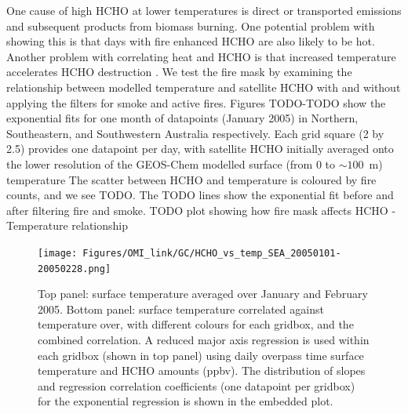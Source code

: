       
      
      
      One cause of high HCHO at lower temperatures is direct or transported emissions and subsequent products from biomass burning.
      One potential problem with showing this is that days with fire enhanced HCHO are also likely to be hot.
      Another problem with correlating heat and HCHO is that increased temperature accelerates HCHO destruction \parencite{Zheng2015}.
      We test the fire mask by examining the relationship between modelled temperature and satellite HCHO with and without applying the filters for smoke and active fires.
      Figures TODO-TODO show the exponential fits for one month of datapoints (January 2005) in Northern, Southeastern, and Southwestern Australia respectively.
      Each grid square (2 by 2.5\degr) provides one datapoint per day, with satellite HCHO initially averaged onto the lower resolution of the GEOS-Chem modelled surface (from 0 to $\sim 100$~m) temperature
      The scatter between HCHO and temperature is coloured by fire counts, and we see TODO.
      The TODO lines show the exponential fit before and after filtering fire and smoke.
      TODO plot showing how fire mask affects HCHO - Temperature relationship
      
      
      \begin{figure}
        \texttt{[image: Figures/OMI\_link/GC/HCHO\_vs\_temp\_SEA\_20050101-20050228.png]}
        \caption{%
          Top panel: surface temperature averaged over January and February 2005.
          Bottom panel: surface temperature correlated against temperature over, with different colours for each gridbox, and the combined correlation. 
          A reduced major axis regression is used within each gridbox (shown in top panel) using daily overpass time surface temperature and HCHO amounts (ppbv).
          The distribution of slopes and regression correlation coefficients (one datapoint per gridbox) for the exponential regression is shown in the embedded plot.
          }
        \label{Model:analysis:HCHO:fig_hcho_vs_temp_SEA_200501}
        \end{figure}
          
